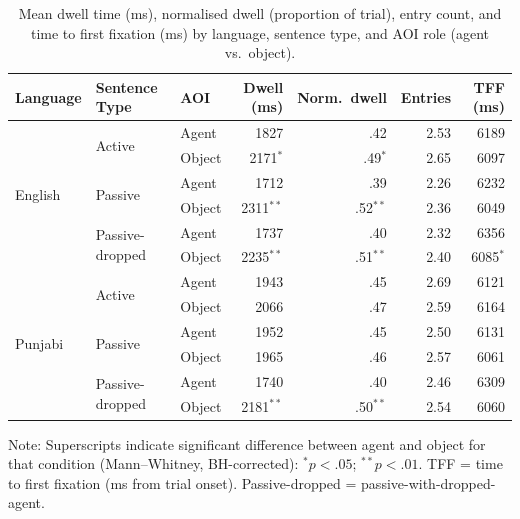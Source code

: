\documentclass[12pt, a4paper]{article}
\begin{document}
\begin{table}[h]
\centering
\caption{Mean dwell time (ms), normalised dwell (proportion of trial),
         entry count, and time to first fixation (ms) by language, sentence type,
         and AOI role (agent vs.\ object).}
\label{tab:aoi_means}
\begin{threeparttable}
\begin{tabular}{lllrrrr}
\toprule
Language & Sentence Type & AOI & Dwell (ms) & Norm.\ dwell & Entries & TFF (ms) \\
\midrule
\multirow{6}{*}{English}
  & \multirow{2}{*}{Active}
    & Agent  & 1827 & .42 & 2.53 & 6189 \\
  & & Object & 2171$^{*}$ & .49$^{*}$ & 2.65 & 6097 \\[2pt]
  & \multirow{2}{*}{Passive}
    & Agent  & 1712 & .39 & 2.26 & 6232 \\
  & & Object & 2311$^{**}$ & .52$^{**}$ & 2.36 & 6049 \\[2pt]
  & \multirow{2}{*}{Passive-dropped}
    & Agent  & 1737 & .40 & 2.32 & 6356 \\
  & & Object & 2235$^{**}$ & .51$^{**}$ & 2.40 & 6085$^{*}$ \\
\midrule
\multirow{6}{*}{Punjabi}
  & \multirow{2}{*}{Active}
    & Agent  & 1943 & .45 & 2.69 & 6121 \\
  & & Object & 2066 & .47 & 2.59 & 6164 \\[2pt]
  & \multirow{2}{*}{Passive}
    & Agent  & 1952 & .45 & 2.50 & 6131 \\
  & & Object & 1965 & .46 & 2.57 & 6061 \\[2pt]
  & \multirow{2}{*}{Passive-dropped}
    & Agent  & 1740 & .40 & 2.46 & 6309 \\
  & & Object & 2181$^{**}$ & .50$^{**}$ & 2.54 & 6060 \\
\bottomrule
\end{tabular}
\begin{tablenotes}
\footnotesize
\item Note: Superscripts indicate significant difference between agent and
      object for that condition (Mann--Whitney, BH-corrected):
      $^{*}p < .05$; $^{**}p < .01$.
      TFF = time to first fixation (ms from trial onset).
      Passive-dropped = passive-with-dropped-agent.
\end{tablenotes}
\end{threeparttable}
\end{table}

\end{document}
